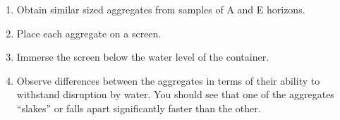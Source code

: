 \documentclass[
  letterpaper,
  twocolumn,
  portrait]{scrbook}
\providecommand{\tightlist}{%
  \setlength{\itemsep}{0pt}\setlength{\parskip}{0pt}}\usepackage{longtable,booktabs,array}
\begin{document}
\begin{enumerate}
\def\labelenumi{\arabic{enumi}.}
\tightlist
\item
  Obtain similar sized aggregates from samples of A and E horizons.
\item
  Place each aggregate on a screen.
\item
  Immerse the screen below the water level of the container.
\item
  Observe differences between the aggregates in terms of their ability
  to withstand disruption by water. You should see that one of the
  aggregates ``slakes'' or falls apart significantly faster than the
  other.
\end{enumerate}

 
  \providecommand{\huxb}[2]{\arrayrulecolor[RGB]{#1}\global\arrayrulewidth=#2pt}
  \providecommand{\huxvb}[2]{\color[RGB]{#1}\vrule width #2pt}
  \providecommand{\huxtpad}[1]{\rule{0pt}{#1}}
  \providecommand{\huxbpad}[1]{\rule[-#1]{0pt}{#1}}
\end{document}
